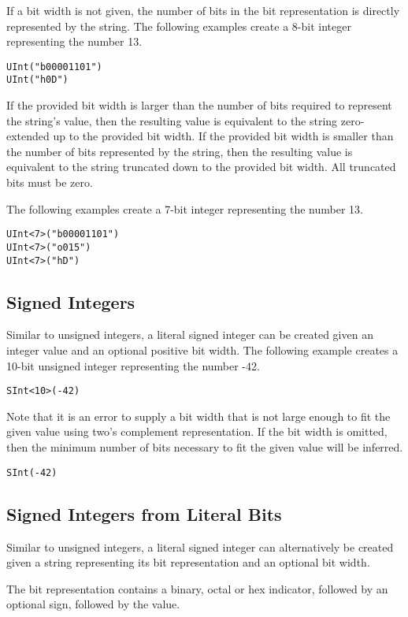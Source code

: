 \documentclass[12pt]{article}
\begin{document}
If a bit width is not given, the number of bits in the bit representation is directly represented by the string. The following examples create a 8-bit integer representing the number 13.
\begin{lstlisting}
UInt("b00001101")
UInt("h0D")
\end{lstlisting}

If the provided bit width is larger than the number of bits required to represent the string's value, then the resulting value is equivalent to the string zero-extended up to the provided bit width. If the provided bit width is smaller than the number of bits represented by the string, then the resulting value is equivalent to the string truncated down to the provided bit width. All truncated bits must be zero.

The following examples create a 7-bit integer representing the number 13.
\begin{lstlisting}
UInt<7>("b00001101")
UInt<7>("o015")
UInt<7>("hD")
\end{lstlisting}

\subsection{Signed Integers}

Similar to unsigned integers, a literal signed integer can be created given an integer value and an optional positive bit width. The following example creates a 10-bit unsigned integer representing the number -42.
\begin{lstlisting}
SInt<10>(-42)
\end{lstlisting}

Note that it is an error to supply a bit width that is not large enough to fit the given value using two's complement representation. If the bit width is omitted, then the minimum number of bits necessary to fit the given value will be inferred.
\begin{lstlisting}
SInt(-42)
\end{lstlisting}

\subsection{Signed Integers from Literal Bits}

Similar to unsigned integers, a literal signed integer can alternatively be created given a string representing its bit representation and an optional bit width.

The bit representation contains a binary, octal or hex indicator, followed by an optional sign, followed by the value.
\end{document}
